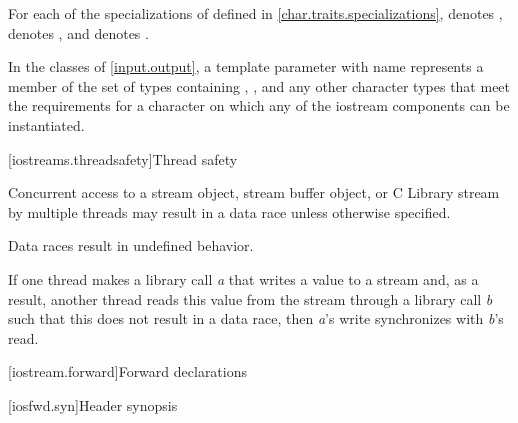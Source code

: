\pnum
\begin{note}
For each of the specializations of  defined in
\ref{char.traits.specializations},
 denotes ,
 denotes ,
and  denotes .
\end{note}

\pnum
In the classes of \ref{input.output}, a template parameter with name
 represents a member of the set of types containing , ,
and any other 
character types that meet the requirements for a character on which any of
the iostream components can be instantiated.

[iostreams.threadsafety]{Thread safety}

\pnum
Concurrent access to a stream object, stream buffer
object, or C Library stream by multiple threads may result in
a data race unless otherwise specified.
\begin{note}
Data races result in undefined behavior.
\end{note}

\pnum
If one thread makes a library call \textit{a} that writes a value to a stream
and, as a result, another thread reads this value from the stream through a
library call \textit{b} such that this does not result in a data race, then
\textit{a}'s write synchronizes with
\textit{b}'s read.

[iostream.forward]{Forward declarations}

[iosfwd.syn]{Header  synopsis}

